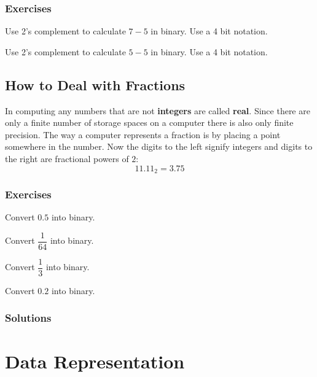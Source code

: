 \documentclass[11pt,a4paper]{report}
\newcommand{\bfb}[1]{{\bf \color{blue} #1}}
\begin{document}
\subsubsection{Exercises}

\begin{ex}
Use 2's complement to calculate $7-5$ in binary. Use a 4 bit notation.
\end{ex}

\begin{ex}
Use 2's complement to calculate $5-5$ in binary. Use a 4 bit notation.
\end{ex}



\subsection{How to Deal with Fractions}
In computing any numbers that are not \bfb{integers} are called \bfb{real}. Since there are only a finite number of storage spaces on a computer there is also only finite precision. The way a computer represents a fraction is by placing a point somewhere in the number. Now the digits to the left signify integers and digits to the right are fractional powers of $2$:
\[
11.11_2 = 3.75
\]


\subsubsection{Exercises}
\begin{ex}
Convert $0.5$ into binary.
\end{ex}


\begin{ex}
Convert $\dfrac{1}{64}$ into binary.
\end{ex}


\begin{ex}
Convert $\dfrac{1}{3}$ into binary.
\end{ex}


\begin{ex}
Convert $0.2$ into binary.
\end{ex}

\newpage

\subsubsection{Solutions}
\printcursols

\newpage
\section{Data Representation}
\end{document}
